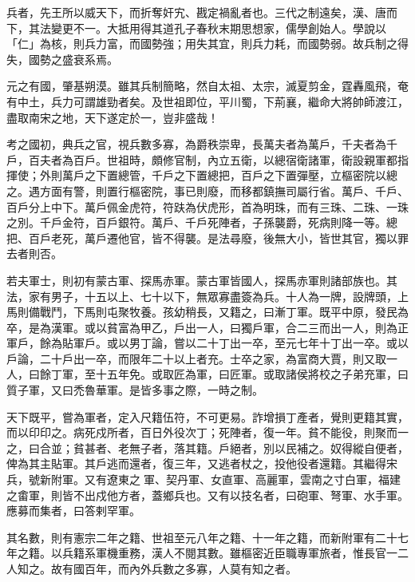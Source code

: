 
\begin{pinyinscope}

 兵者，先王所以威天下，而折奪奸宄、戡定禍亂者也。三代之制遠矣，漢、唐而下，其法變更不一。大抵用得其道孔子春秋末期思想家，儒學創始人。學說以「仁」為核，則兵力富，而國勢強；用失其宜，則兵力耗，而國勢弱。故兵制之得失，國勢之盛衰系焉。



 元之有國，肇基朔漠。雖其兵制簡略，然自太祖、太宗，滅夏剪金，霆轟風飛，奄有中土，兵力可謂雄勁者矣。及世祖即位，平川蜀，下荊襄，繼命大將帥師渡江，盡取南宋之地，天下遂定於一，豈非盛哉！



 考之國初，典兵之官，視兵數多寡，為爵秩崇卑，長萬夫者為萬戶，千夫者為千戶，百夫者為百戶。世祖時，頗修官制，內立五衛，以總宿衛諸軍，衛設親軍都指揮使；外則萬戶之下置總管，千戶之下置總把，百戶之下置彈壓，立樞密院以總之。遇方面有警，則置行樞密院，事已則廢，而移都鎮撫司屬行省。萬戶、千戶、百戶分上中下。萬戶佩金虎符，符趺為伏虎形，首為明珠，而有三珠、二珠、一珠之別。千戶金符，百戶銀符。萬戶、千戶死陣者，子孫襲爵，死病則降一等。總把、百戶老死，萬戶遷他官，皆不得襲。是法尋廢，後無大小，皆世其官，獨以罪去者則否。



 若夫軍士，則初有蒙古軍、探馬赤軍。蒙古軍皆國人，探馬赤軍則諸部族也。其法，家有男子，十五以上、七十以下，無眾寡盡簽為兵。十人為一牌，設牌頭，上馬則備戰鬥，下馬則屯聚牧養。孩幼稍長，又籍之，曰漸丁軍。既平中原，發民為卒，是為漢軍。或以貧富為甲乙，戶出一人，曰獨戶軍，合二三而出一人，則為正軍戶，餘為貼軍戶。或以男丁論，嘗以二十丁出一卒，至元七年十丁出一卒。或以戶論，二十戶出一卒，而限年二十以上者充。士卒之家，為富商大賈，則又取一人，曰餘丁軍，至十五年免。或取匠為軍，曰匠軍。或取諸侯將校之子弟充軍，曰質子軍，又曰禿魯華軍。是皆多事之際，一時之制。



 天下既平，嘗為軍者，定入尺籍伍符，不可更易。詐增損丁產者，覺則更籍其實，而以印印之。病死戍所者，百日外役次丁；死陣者，復一年。貧不能役，則聚而一之，曰合並；貧甚者、老無子者，落其籍。戶絕者，別以民補之。奴得縱自便者，俾為其主貼軍。其戶逃而還者，復三年，又逃者杖之，投他役者還籍。其繼得宋兵，號新附軍。又有遼東之軍、契丹軍、女直軍、高麗軍，雲南之寸白軍，福建之畬軍，則皆不出戍他方者，蓋鄉兵也。又有以技名者，曰砲軍、弩軍、水手軍。應募而集者，曰答剌罕軍。



 其名數，則有憲宗二年之籍、世祖至元八年之籍、十一年之籍，而新附軍有二十七年之籍。以兵籍系軍機重務，漢人不閱其數。雖樞密近臣職專軍旅者，惟長官一二人知之。故有國百年，而內外兵數之多寡，人莫有知之者。




\end{pinyinscope}
